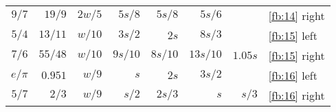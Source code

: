 \documentclass[10pt,letterpaper,extrafontsizes]{memoir}
\begin{document}
\begin{table}
\begin{tabular}{|r|r|rrrrr|l|}
$9/7$      & $19/9$  & $2w/5$   & $5s/8$ & $5s/8$  & $5s/6$  &       & \ref{fb:14} right \\ %
$5/4$      & $13/11$ & $w/10$   & $3s/2$ & $2s$    & $8s/3$  &       & \ref{fb:15} left \\ %
$7/6$      & $55/48$ & $w/10$   & $9s/10$ & $8s/10$ & $13s/10$ & $1.05s$ & \ref{fb:15} right \\ %
$e/\pi$    & $0.951$ & $w/9$    & $s$    & $2s$    & $3s/2$  &       & \ref{fb:16} left \\ %
$5/7$      & $2/3$   & $w/9$    & $s/2$  & $2s/3$  & $s$     & $s/3$ & \ref{fb:16} right \\ \hline %
\end{tabular}
\end{table}
\end{document}
